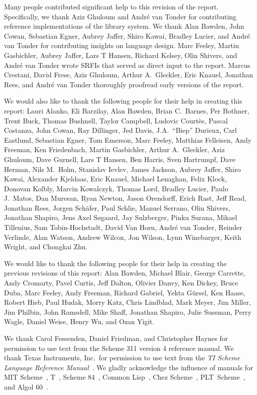 Many people contributed significant help to this revision of the
report.  Specifically, we thank Aziz Ghuloum and Andr\'e van Tonder for
contributing reference implementations of the library system.  We
thank Alan Bawden, John Cowan, Sebastian Egner, Aubrey Jaffer, Shiro
Kawai, Bradley Lucier, and Andr\'e van Tonder for contributing insights on
language design.  Marc Feeley, Martin Gasbichler, Aubrey Jaffer, Lars T Hansen,
Richard Kelsey, Olin Shivers, and Andr\'e van Tonder wrote SRFIs that
served as direct input to the report.  Marcus Crestani, David Frese,
Aziz Ghuloum, Arthur A.\ Gleckler, Eric Knauel, Jonathan Rees, and Andr\'e
van Tonder thoroughly proofread early versions of the report.

We would also like to thank the following people for their
help in creating this report: Lauri Alanko,
Eli Barzilay, Alan Bawden, Brian C.\ Barnes, Per Bothner, Trent Buck,
Thomas Bushnell, Taylor Campbell, Ludovic Court\`es, Pascal Costanza,
John Cowan, Ray Dillinger, Jed Davis, J.A.\ ``Biep'' Durieux, Carl Eastlund,
Sebastian Egner, Tom Emerson, Marc Feeley, Matthias Felleisen, Andy
Freeman, Ken Friedenbach, Martin Gasbichler, Arthur A.\ Gleckler, Aziz
Ghuloum, Dave Gurnell, Lars T Hansen, Ben Harris, Sven Hartrumpf, Dave
Herman, Nils M.\ Holm, Stanislav Ievlev, James Jackson, Aubrey Jaffer,
Shiro Kawai, Alexander Kjeldaas, Eric Knauel, Michael Lenaghan, Felix Klock,
Donovan Kolbly, Marcin Kowalczyk, Thomas Lord, Bradley Lucier, Paulo
J.\ Matos, Dan Muresan, Ryan Newton, Jason Orendorff, Erich Rast, Jeff
Read, Jonathan Rees, Jorgen Sch\"afer, Paul Schlie, Manuel Serrano,
Olin Shivers, Jonathan Shapiro, Jens Axel S\o{}gaard, Jay Sulzberger,
Pinku Surana, Mikael Tillenius, Sam Tobin-Hochstadt, David Van Horn,
Andr\'e van Tonder, Reinder Verlinde, Alan Watson, Andrew Wilcox, Jon
Wilson, Lynn Winebarger, Keith Wright, and Chongkai Zhu.

We would like to thank the following people for their help in creating
the previous revisions of this report: Alan Bawden, Michael
Blair, George Carrette, Andy Cromarty, Pavel Curtis, Jeff Dalton, Olivier Danvy,
Ken Dickey, Bruce Duba, Marc Feeley,
Andy Freeman, Richard Gabriel, Yekta G\"ursel, Ken Haase, Robert
Hieb, Paul Hudak, Morry Katz, Chris Lindblad, Mark Meyer, Jim Miller, Jim Philbin,
John Ramsdell, Mike Shaff, Jonathan Shapiro, Julie Sussman,
Perry Wagle, Daniel Weise, Henry Wu, and Ozan Yigit.

We thank Carol Fessenden, Daniel
Friedman, and Christopher Haynes for permission to use text from the Scheme 311
version 4 reference manual.  We thank Texas Instruments, Inc.~for permission to
use text from the {\em TI Scheme Language Reference Manual}~\cite{TImanual85}.
We gladly acknowledge the influence of manuals for MIT Scheme~\cite{MITScheme},
T~\cite{Rees84}, Scheme 84~\cite{Scheme84}, Common Lisp~\cite{CLtL},
Chez Scheme~\cite{csug7}, PLT~Scheme~\cite{mzscheme352},
and Algol 60~\cite{Naur63}.


